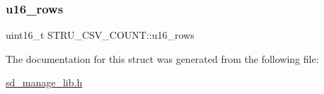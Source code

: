 \subsubsection{\texorpdfstring{u16\+\_\+rows}{u16\_rows}}
{\footnotesize\ttfamily uint16\+\_\+t S\+T\+R\+U\+\_\+\+C\+S\+V\+\_\+\+C\+O\+U\+N\+T\+::u16\+\_\+rows}



The documentation for this struct was generated from the following file\+:\begin{DoxyCompactItemize}
\item 
\hyperlink{sd__manage__lib_8h}{sd\+\_\+manage\+\_\+lib.\+h}\end{DoxyCompactItemize}

